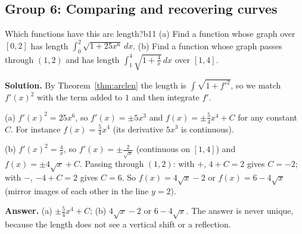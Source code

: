 \documentclass[11pt]{article}
\begin{document}
\subsection*{Group 6: Comparing and recovering curves}

\begin{exmp}{Which functions have this arc length?}{b11}
(a) Find a function whose graph over $[0,2]$ has length $\int_0^2\sqrt{1+25x^6}\,dx$. (b) Find a function whose graph passes through $(1,2)$ and has length $\int_1^4\sqrt{1+\frac4x}\,dx$ over $[1,4]$.

\textbf{Solution.} By Theorem~\ref{thm:arclen} the length is $\int\sqrt{1+f'^2}$, so we match $f'(x)^2$ with the term added to $1$ and then integrate $f'$.

(a) $f'(x)^2=25x^6$, so $f'(x)=\pm5x^3$ and $f(x)=\pm\frac54x^4+C$ for any constant $C$. For instance $f(x)=\frac54x^4$ (its derivative $5x^3$ is continuous).

(b) $f'(x)^2=\frac4x$, so $f'(x)=\pm\frac2{\sqrt x}$ (continuous on $[1,4]$) and $f(x)=\pm4\sqrt x+C$. Passing through $(1,2)$: with $+$, $4+C=2$ gives $C=-2$; with $-$, $-4+C=2$ gives $C=6$. So $f(x)=4\sqrt x-2$ or $f(x)=6-4\sqrt x$ (mirror images of each other in the line $y=2$).

\textbf{Answer.} (a) $\pm\frac54x^4+C$; (b) $4\sqrt x-2$ or $6-4\sqrt x$. The answer is never unique, because the length does not see a vertical shift or a reflection.
\end{exmp}
\end{document}
